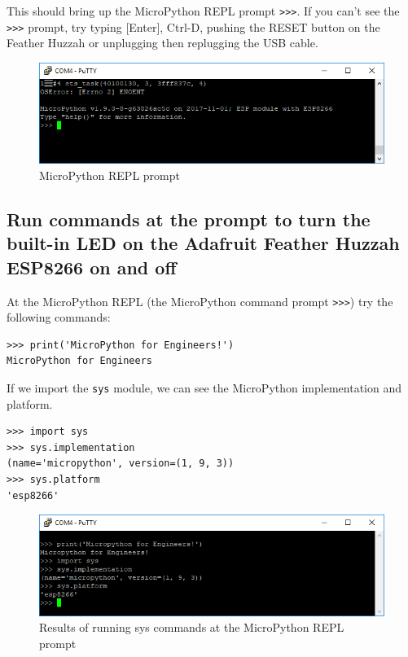 \documentclass{book}
\makeatletter
\def\maxwidth{\ifdim\Gin@nat@width>\linewidth\linewidth
    \else\Gin@nat@width\fi}
\let\Oldincludegraphics\includegraphics
\renewcommand{\includegraphics}[1]{\Oldincludegraphics[width=.8\maxwidth]{#1}}
\makeatother
\begin{document}
This should bring up the MicroPython REPL prompt \lstinline!>>>!. If you
can't see the \lstinline!>>>! prompt, try typing {[}Enter{]}, Ctrl-D,
pushing the RESET button on the Feather Huzzah or unplugging then
replugging the USB cable.

\begin{figure}
\centering
\includegraphics{images/REPL_prompt.PNG}
\caption{MicroPython REPL prompt}
\end{figure}

    \subsection{Run commands at the prompt to turn the built-in LED on the
Adafruit Feather Huzzah ESP8266 on and
off}\label{run-commands-at-the-prompt-to-turn-the-built-in-led-on-the-adafruit-feather-huzzah-esp8266-on-and-off}

    At the MicroPython REPL (the MicroPython command prompt \lstinline!>>>!)
try the following commands:

\begin{lstlisting}
>>> print('MicroPython for Engineers!')
MicroPython for Engineers
\end{lstlisting}

If we import the \lstinline!sys! module, we can see the MicroPython
implementation and platform.

\begin{lstlisting}
>>> import sys
>>> sys.implementation
(name='micropython', version=(1, 9, 3))
>>> sys.platform
'esp8266'
\end{lstlisting}

\begin{figure}
\centering
\includegraphics{images/sys_dot_implementation_and_platform.PNG}
\caption{Results of running sys commands at the MicroPython REPL prompt}
\end{figure}
\end{document}
